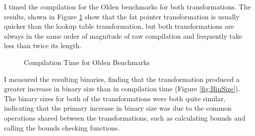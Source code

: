 I timed the compilation for the Olden benchmarks for both transformations.
The results, shown in Figure \ref{fig:CompTime} show that the fat pointer transformation is usually quicker than the lookup table transformation, but both transformations are always in the same order of magnitude of raw compilation and frequently take less than twice its length.
\begin{figure}
\centering
{}
\caption{Compilation Time for Olden Benchmarks}
\label{fig:CompTime}
\end{figure}

I measured the resulting binaries, finding that the transformation produced a greater increase in binary size than in compilation time (Figure \ref{fig:BinSize}).
The binary sizes for both of the transformations were both quite similar, indicating that the primary increase in binary size was due to the common operations shared between the transformations, such as calculating bounds and calling the bounds checking functions.

